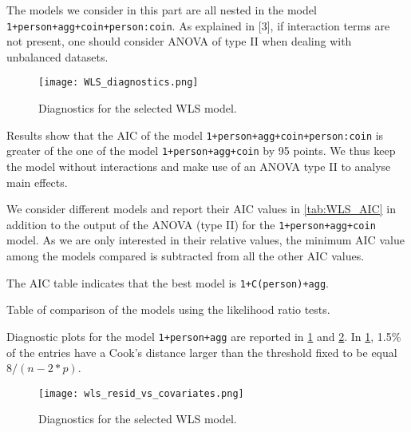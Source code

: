 \documentclass[a4paper, 12pt,oneside]{article}
\begin{document}
			The models we consider in this part are all nested in the model \texttt{1+person+agg+coin+person:coin}. As explained in [3], if interaction terms are not present, one should consider ANOVA of type II when dealing with unbalanced datasets.
			\begin{figure}[htb]
				\centering
				\texttt{[image: WLS\_diagnostics.png]}
				\caption{Diagnostics for the selected WLS model.}
				\label{fig:wls-diagnostic}
			\end{figure}
			
			Results show that the AIC of the model \texttt{1+person+agg+coin+person:coin} is greater of the one of the model \texttt{1+person+agg+coin} by 95 points. We thus keep the model without interactions and make use of an ANOVA type II to analyse main effects. 

			We consider different models and report their AIC values in \ref{tab:WLS_AIC} in addition to the output of the ANOVA (type II) for the \texttt{1+person+agg+coin} model. As we are only interested in their relative values, the minimum AIC value among the models compared is subtracted from all the other AIC values. 

			The AIC table indicates that the best model is \texttt{1+C(person)+agg}. 

			Table of comparison of the models using the likelihood ratio tests. 


			Diagnostic plots for the model \texttt{1+person+agg} are reported in \ref{fig:wls-diagnostic} and \ref{fig:wls-diagnostic-time-coefs}. In \ref{fig:wls-diagnostic}, 1.5\% of the entries have a Cook's distance larger than the threshold fixed to be equal $8/(n-2*p)$. 

			\begin{figure}[htb]
				\centering
				\texttt{[image: wls\_resid\_vs\_covariates.png]}
				\caption{Diagnostics for the selected WLS model.}
				\label{fig:wls-diagnostic-time-coefs}
			\end{figure}
\end{document}
